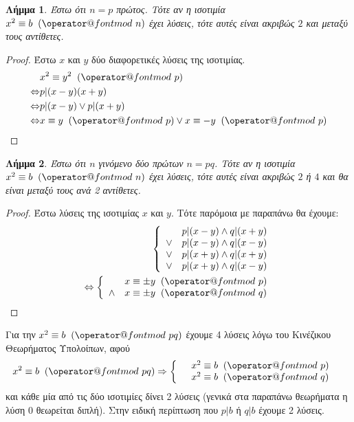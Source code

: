 \documentclass[11pt,a4paper]{book}
\makeatletter
\newtheorem*{lemma}{Λήμμα}
\def\imod#1{\allowbreak\mkern10mu({\operator@font mod}\,\,#1)}
\makeatother
\begin{document}
\begin{lemma}
Έστω ότι $n = p$ πρώτος. Τότε αν η ισοτιμία $x^2 \equiv b \imod n$ έχει λύσεις, τότε αυτές είναι ακριβώς $2$ και μεταξύ τους αντίθετες.
\end{lemma}
\begin{proof}
Έστω $x$ και $y$ δύο διαφορετικές λύσεις της ισοτιμίας.
\begin{align*}
&x^2 \equiv y^2 \imod p\\
\Leftrightarrow & p | (x-y)(x+y)\\
\Leftrightarrow & p | (x-y) \lor p | (x+y)\\
\Leftrightarrow & x \equiv y \imod p \lor x \equiv -y \imod p
\end{align*}
\end{proof}
\begin{lemma}
Έστω ότι $n$ γινόμενο δύο πρώτων $n = pq$. Τότε αν η ισοτιμία $x^2 \equiv b \imod n$ έχει λύσεις, τότε αυτές είναι ακριβώς $2$ ή $4$ και θα είναι μεταξύ τους ανά 2 αντίθετες.
\end{lemma}
\begin{proof}
Έστω λύσεις της ισοτιμίας $x$ και $y$. Τότε παρόμοια με παραπάνω θα έχουμε:
\begin{align*}
\left\{\begin{array}{llll}
     & p|(x-y) \land q|(x+y)\\
\lor & p|(x-y) \land q|(x-y)\\
\lor & p|(x+y) \land q|(x+y)\\
\lor & p|(x+y) \land q|(x-y)
\end{array}\right.\\
\Leftrightarrow \left\{\begin{array}{ll}
     &x \equiv \pm y \imod p\\
     \land &x \equiv \pm y \imod q
\end{array}\right.
\end{align*}
\end{proof}

Για την $x^2 \equiv  b \imod {pq} $ έχουμε 4 λύσεις λόγω του Κινέζικου Θεωρήματος Υπολοίπων, αφού 
\begin{align*}
	&x^2 \equiv b \imod {pq}
	\Rightarrow 
	\left\{\begin{array}{ll} & x^2 \equiv b \imod p\\
	& x^2 \equiv b \imod q\end{array}\right.
\end{align*}
και κάθε μία από τις δύο ισοτιμίες δίνει 2 λύσεις (γενικά στα παραπάνω θεωρήματα η λύση $0$ θεωρείται διπλή). Στην ειδική περίπτωση που $p|b$ ή $q|b$ έχουμε 2 λύσεις.
\end{document}
